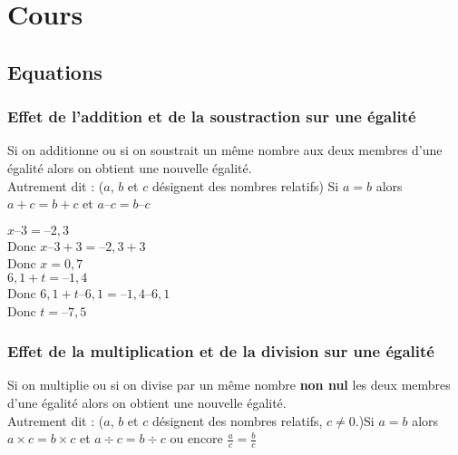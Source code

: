 \documentclass[10pt]{article}
\begin{document}
{\newpage


\section{Cours}
\subsection{Equations}
\subsubsection{Effet de l'addition et de la soustraction sur une égalité}
\begin{shaded}
\begin{Pp}
Si on additionne ou si on soustrait un même nombre aux deux membres d'une égalité
alors on obtient une nouvelle égalité.
\\Autrement dit : ($a$, $b$ et $c$ désignent des nombres relatifs)\hspace{1cm} Si     $a = b$ 	alors 	$a + c = b + c$		et 	 $a – c = b – c$
\end{Pp}
\end{shaded}

\begin{Ex}
\begin{multicols}{2}
$x – 3=–2,3$\\
Donc $x – 3 + 3=–2,3 + 3$\\
Donc $x=0,7$\\


$6,1 + t=–1,4$\\
Donc $6,1 + t – 6,1=–1,4 – 6,1$\\
Donc $t=–7,5$
\end{multicols}
\end{Ex}
\subsubsection{Effet de la multiplication et de la division sur une égalité}
\begin{shaded}
\begin{Pp}
Si on multiplie ou si on divise par un même nombre \textbf{non nul} les deux membres d'une égalité
alors on obtient une nouvelle égalité.
\\Autrement dit : ($a$, $b$ et $c$ désignent des nombres relatifs, $c \neq 0$.)Si     $a = b$ 	alors 	$a \times c = b \times c$		et 	$a \div c = b \div c$ ou encore $\frac{a}{c}=\frac{b}{c}$
\end{Pp}
\end{shaded}

}
\end{document}
